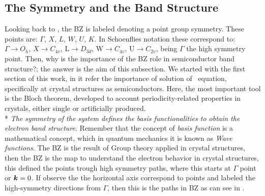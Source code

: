\subsection{The Symmetry and the Band Structure}
\label{subsec:chapter-2-brillouin-bandstructure}
\vspace{-10mm}
Looking back  to , the \gls{BZ} is labeled
denoting a point group symmetry. These points are:  $\Gamma$, $X$, $L$, $W$, $U$, $K$.  In Schoenflies notation these correspond to: $\Gamma\to O_{h}$, $X\to C_{4v}$, $\mathrm{L}\to D_{3d}$, $\mathrm{W}\to C_{4v}$, $\mathrm{U}\to C_{2v}$, being $\Gamma$ the high symmetry point. Then, why is the importance of the \gls{BZ} role in semiconductor band structure?; the answer is the aim of this subsection. We started with the first section of this work, in it refer the importance of solution of \sch\,  equation, specifically at crystal structures as semiconductors. Here, the most important tool is the Bloch theorem, developed to account periodicity-related properties in crystals, either single or artificially produced.\\*
\emph{The symmetry of the system defines the basis functionalities to obtain the electron band structure}\cite{dresselhaus2007group,cardona2005fundamentals,parmenter1955symmetry,butcher2013crystalline}.  Remember that the concept of \emph{basis function} is a mathematical concept, which in quantum mechanics it is known as \emph{Wave functions}. 
The \gls{BZ} is the result of Group theory applied in crystal structures, then the \gls{BZ} is the map to understand the electron behavior in crystal structures, this defined the \ks points trough high symmetry paths, where this starts at $\Gamma$ point or $\boldsymbol{k} =0$.  If observe the  the horizontal axis correspond to \ks points and labeled the high-symmetry directions from $\Gamma$, then this is the \ks paths in \gls{BZ} as can see in . 

